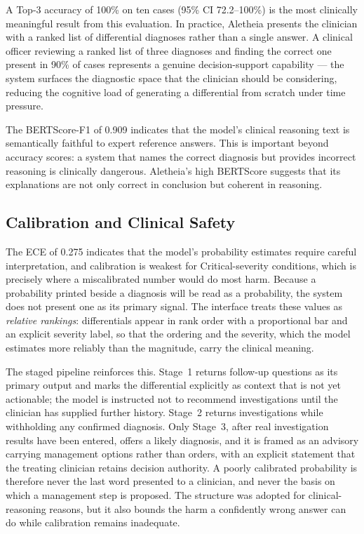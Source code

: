 \documentclass[conference]{IEEEtran}
\begin{document}
A Top-3 accuracy of 100\% on ten cases (95\% CI 72.2--100\%) is
the most clinically meaningful
result from this evaluation. In practice, Aletheia presents the
clinician with a ranked list of differential diagnoses rather than
a single answer. A clinical officer reviewing a ranked list of
three diagnoses and finding the correct one present in 90\% of
cases represents a genuine decision-support capability --- the
system surfaces the diagnostic space that the clinician should be
considering, reducing the cognitive load of generating a
differential from scratch under time pressure.

The BERTScore-F1 of 0.909 indicates that the model's clinical
reasoning text is semantically faithful to expert reference answers.
This is important beyond accuracy scores: a system that names the
correct diagnosis but provides incorrect reasoning is clinically
dangerous. Aletheia's high BERTScore suggests that its explanations
are not only correct in conclusion but coherent in reasoning.

\subsection{Calibration and Clinical Safety}

The ECE of 0.275 indicates that the model's probability estimates
require careful interpretation, and calibration is weakest for
Critical-severity conditions, which is precisely where a miscalibrated
number would do most harm. Because a probability printed beside a
diagnosis will be read as a probability, the system does not present
one as its primary signal. The interface treats these values as
\textit{relative rankings}: differentials appear in rank order with a
proportional bar and an explicit severity label, so that the ordering
and the severity, which the model estimates more reliably than the
magnitude, carry the clinical meaning.

The staged pipeline reinforces this. Stage~1 returns follow-up
questions as its primary output and marks the differential explicitly
as context that is not yet actionable; the model is instructed not to
recommend investigations until the clinician has supplied further
history. Stage~2 returns investigations while withholding any confirmed
diagnosis. Only Stage~3, after real investigation results have been
entered, offers a likely diagnosis, and it is framed as an advisory
carrying management options rather than orders, with an explicit
statement that the treating clinician retains decision authority. A
poorly calibrated probability is therefore never the last word
presented to a clinician, and never the basis on which a management
step is proposed. The structure was adopted for clinical-reasoning
reasons, but it also bounds the harm a confidently wrong answer can do
while calibration remains inadequate.
\end{document}
